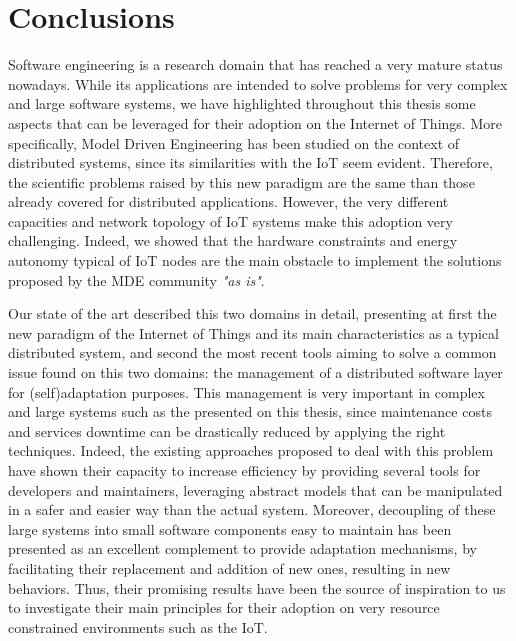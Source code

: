 \chapter{Conclusions}
\label{sec:Conclusions}
Software engineering is a research domain that has reached a very mature status nowadays.
While its applications are intended to solve problems for very complex and large software systems, we have highlighted throughout this thesis some aspects that can be leveraged for their adoption on the Internet of Things.
More specifically, Model Driven Engineering has been studied on the context of distributed systems, since its similarities with the IoT seem evident.
Therefore, the scientific problems raised by this new paradigm are the same than those already covered for distributed applications.
However, the very different capacities and network topology of IoT systems make this adoption very challenging.
Indeed, we showed that the hardware constraints and energy autonomy typical of IoT nodes are the main obstacle to implement the solutions proposed by the MDE community \textit{"as is"}.

Our state of the art described this two domains in detail, presenting at first the new paradigm of the Internet of Things and its main characteristics as a typical distributed system, and second the most recent tools aiming to solve a common issue found on this two domains: the management of a distributed software layer for (self)adaptation purposes.
This management is very important in complex and large systems such as the presented on this thesis, since maintenance costs and services downtime can be drastically reduced by applying the right techniques.
Indeed, the existing approaches proposed to deal with this problem have shown their capacity to increase efficiency by providing several tools for developers and maintainers, leveraging abstract models that can be manipulated in a safer and easier way than the actual system.
Moreover, decoupling of these large systems into small software components easy to maintain has been presented as an excellent complement to provide adaptation mechanisms, by facilitating their replacement and addition of new ones, resulting in new behaviors.
Thus, their promising results have been the source of inspiration to us to investigate their main principles for their adoption on very resource constrained environments such as the IoT.

